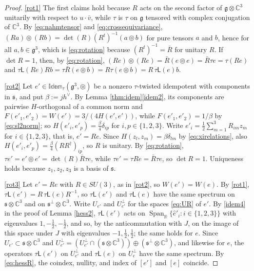 \documentclass[leqno,10pt]{amsart}
\theoremstyle{definition}
\numberwithin{equation}{section}
\newcommand{\idem}{\mathbb{Idem}}
\newcommand{\tmlt}{\circledcirc}
\newcommand{\lin}{\mathsf{L}}
\newcommand{\spn}{\operatorname{Span}}
\newcommand{\g}{\mathfrak{g}}
\newcommand{\rea}{\mathbb R}
\newcommand{\com}{\mathbb C}
\newcommand{\hv}{h^\vee}
\newcommand{\subs}{\mathfrak{s}}
\newcommand{\Usp}{U}
\newcommand{\Uperp}{\Usp^{\perp}}
\begin{document}
\begin{proof}
\ref{rot1} The first claims hold because $R$ acts on the second factor of $\g \otimes \com^{3}$ unitarily with respect to $u \cdot \bar{v}$, while $\tau$ is $\tau$ on $\g$ tensored with complex conjugation of $\com^{3}$. By \eqref{eq:nahmtensor} and \eqref{eq:crossequivariance}, $(Ra) \tmlt (Rb) = \det(R)(R^{t})^{-1}(a \tmlt b)$ for pure tensors $a$ and $b$, hence for all $a, b \in \g^{3}$, which is \eqref{eq:rotation} because $(R^{t})^{-1} = \bar{R}$ for unitary $R$. If $\det R = 1$, then, by \eqref{eq:rotation}, $(Re) \tmlt (Re) = \bar{R}(e \tmlt e) = \bar{R}\tau e = \tau(Re)$ and $\tau\lin(Re)Rb = \tau\bar{R}(e \tmlt b) = R\tau(e \tmlt b) = R\,\tau\lin(e)b$.

\ref{rot2} Let $e' \in\idem_{\tau}(\g^{3}, \tmlt)$ be a nonzero $\tau$-twisted idempotent with components in $\subs$, and put $\beta := j\hv$. By Lemma \ref{thm:idem}\ref{idem2}, its components are pairwise $H$-orthogonal of a common norm and $F(e'_{1}, e'_{2}) = W(e') = 3/(4H(e', e'))$, while $F(e'_{1}, e'_{2}) = 1/\beta$ by \eqref{eq:sl2norm}; so $H(e'_{i}, e'_{p}) = \tfrac{\beta}{4}\delta_{ip}$ for $i, p \in \{1, 2, 3\}$. Write $e'_{i} = \tfrac{1}{2}\sum_{m=1}^{3}R_{im}z_{m}$ for $i \in \{1, 2, 3\}$, that is, $e' = Re$. Since $H(z_{l}, z_{m}) = \beta\delta_{lm}$ by \eqref{eq:xirelations}, also $H(e'_{i}, e'_{p}) = \tfrac{\beta}{4}(RR^{\dagger})_{ip}$, so $R$ is unitary. By \eqref{eq:rotation}, $\tau e' = e' \tmlt e' = \det(R)\bar{R}\tau e$, while $\tau e' = \tau Re = \bar{R}\tau e$, so $\det R = 1$. Uniqueness holds because $z_{1}, z_{2}, z_{3}$ is a basis of $\subs$.

\ref{rot3} Let $e' = Re$ with $R \in SU(3)$, as in \ref{rot2}, so $W(e') = W(e)$. By \ref{rot1}, $\tau\lin(e') = R\,\tau\lin(e)R^{-1}$, so $\tau\lin(e')$ and $\tau\lin(e)$ have the same spectrum on $\subs\otimes\com^{3}$ and on $\subs^{\perp}\otimes\com^{3}$. Write $\Usp_{e'}$ and $\Uperp_{e'}$ for the spaces \eqref{eq:UR} of $e'$. By \eqref{idem4} in the proof of Lemma \ref{hess2}, $\tau\lin(e')$ acts on $\spn_{\rea}\{\hat{e}'_{i}: i \in \{1, 2, 3\}\}$ with eigenvalues $1, -\tfrac{1}{2}, -\tfrac{1}{2}$, and so, by the anticommutation with $J$, on the image of this space under $J$ with eigenvalues $-1, \tfrac{1}{2}, \tfrac{1}{2}$; the same holds for $e$. Since $\Usp_{e'} \subset \subs \otimes \com^{3}$ and $\Uperp_{e'} = (\Uperp_{e'} \cap (\subs\otimes\com^{3})) \oplus (\subs^{\perp}\otimes\com^{3})$, and likewise for $e$, the operators $\tau\lin(e')$ on $\Uperp_{e'}$ and $\tau\lin(e)$ on $\Uperp_{e}$ have the same spectrum. By \eqref{eq:hessR}, the coindex, nullity, and index of $[e']$ and $[e]$ coincide.
\end{proof}
\end{document}
